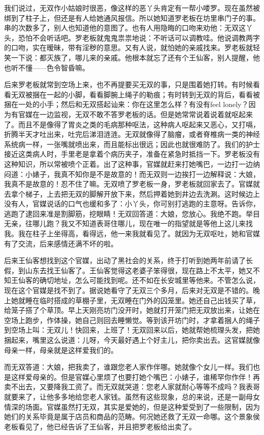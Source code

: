 我们说过，无双作小姑娘时很恶，像这样的恶丫头肯定有一帮小喽罗。现在虽然被绑到了柱子上，但还是有人给她通风报信。所以她知道罗老板在坊里串门子的事。串的次数多了，别人也知道他的意图了。也有人用隐晦的口吻来劝他：无双这丫头，恐怕不会听话吧。罗老板就鬼鬼祟祟地说：不听话可以调教哇。他说调教两字的口吻，实在暧昧，带有淫秽的意思。又有人说，就怕她的亲戚找来。罗老板就轻笑一下说：都灭族了，哪儿来的亲戚。他根本就忘了还有个王仙客，别人提醒，他也听不懂——色令智昏嘛。 

后来罗老板就常到空场上来，也不再提要买无双的事，只是围着她打转。有时候看看无双被捆在一起的小脚，看看脚腕上绳子的勒痕；有时转到无双的背后，看看被捆在一处的小手；然后和无双搭起讪来：你在这里怎么样？有没有feel lonely？因为有官媒在一边监视，无双不敢不答罗老板的话。但是她常常说着说着就呕起来了。而且不是像得了胃炎之类的毛病那种呕法，这种病人呕起来又恶心，又打嗝，折腾半天才吐出来，吐完后涕泪涟涟。无双就像得了脑瘤，或者脊椎病一类的神经系统病一样，一张嘴就喷出来，而且能标出很远；因此也就很难防了。我们的护士接近这类病人时，手里老是拿着个病历夹子，准备在紧急时抵挡一下。罗老板没有这种知识，所以常被喷个正着。出了这种事，官媒就赶来打她嘴巴，一边打一边纳闷道：小婊子，我真不知你是不是故意的！而无双则一边挨打一边解释说：大娘，我真不是故意的！忍不住了嘛。无双喷了罗老板一身，罗老板就回家去了。官媒就去拿个梯子，上去把无双的脚解开放下来，然后押着她到井边去洗涮。这时候边上没有人，官媒说话的口气也缓和多了：小丫头，你可别打逃跑的主意呀。告诉你，逃跑了逮回来准是割脚筋，挖眼睛！无双回答道：大娘，您放心。我绝不跑。举目无亲，往哪儿跑？我又不知道表哥住哪儿，现在唯一的指望就是等他上这儿来找我。我在柱子上坐得高，看得远，他一来我就看见了。就因为无双呕吐，她和官媒有了交流，后来感情还满不坏的啦。 

后来王仙客想找到这个官媒，出动了黑社会的关系，终于打听到她两年前请了长假，到山东去找王仙客了。王仙客觉得这老婆子笨得很，现在路上不太平，她又不知王仙客的确切地址，怎么可能找到呢。还不如在长安城里等他来。不管怎么说，现在这个官媒是找不到了。据说她看守了无双三个多月，后来对无双是不错的。晚上她就睡在临时搭成的草棚子里，无双睡在门外的囚笼里。她还自己出钱买了草，给笼子搭了个草顶。早上天刚亮坊门没开时，她就打开笼门把无双放出来，让她在空场上跑步，作体操，她自己则回去睡懒觉。等到该开坊门时，才拿着捆人的绳子到空场上叫：无双儿！快回来，上班了！无双回来以后，她就帮她梳理头发，把她捆起来，嘴里这么说道：儿呀，今天最好遇上个好主儿，把你卖出去。这官媒就像母亲一样，母亲就是这样爱我们的。 

而无双答道：大娘，把我卖了，谁跟您老人家作伴哪。她就像个女儿一样。我们也是这样爱母亲的。但是官媒心里烦了也要打她个嘴巴：小婊子，谁稀罕你作伴！再卖不出去，又要降我工资了。而无双就哭道：您老人家就耐心等等不成吗？我表哥就要来了，让他多多地给您老人家钱。虽然有这些现象，总的来说，还是一副母女情深的场面。官媒虽然打无双，其实是爱她的，但是这种爱受到了一些限制，因为她们的关系毕竟是属于店员和商品的范畴。何况她还救了无双一命哪。这个景象侯老板看见了，他已经告诉了王仙客，并且把罗老板给出卖了。 

